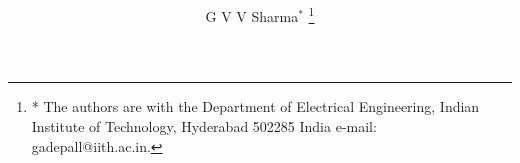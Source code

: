 \documentclass[journal,12pt,twocolumn]{IEEEtran}
\begin{document}
\let\StandardTheFigure\thefigure
\let\StandardTheTable\thetable
\let\vec\mathbf

\renewcommand{\thefigure}{\theproblem}
\renewcommand{\thetable}{\theproblem}


\def\putbox#1#2#3{\makebox[0in][l]{\makebox[#1][l]{}\raisebox{\baselineskip}[0in][0in]{\raisebox{#2}[0in][0in]{#3}}}}
     \def\rightbox#1{\makebox[0in][r]{#1}}
     \def\centbox#1{\makebox[0in]{#1}}
     \def\topbox#1{\raisebox{-\baselineskip}[0in][0in]{#1}}
     \def\midbox#1{\raisebox{-0.5\baselineskip}[0in][0in]{#1}}

\vspace{3cm}


\title{%
}


%
%
%

\author{G V V Sharma$^{*}$%
\thanks{* The authors are with the Department
of Electrical Engineering, Indian Institute of Technology, Hyderabad
502285 India e-mail:  gadepall@iith.ac.in.}%
}
% 
%
\end{document}

